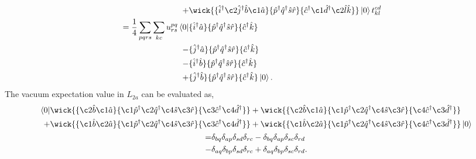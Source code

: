 \begin{align}
\begin{aligned}
{            } \\
            +
            &\wick{
            \{\hat{i}^\dagger \c2{\hat{j}}^\dagger \hat{b} \c1{\hat{a}} \}
            \{\hat{p}^\dagger \hat{q}^\dagger \hat{s} \hat{r} \}
            \{\hat{c}^\dagger \c1{\hat{d}^\dagger} \c2{\hat{l}} \hat{k} \}
            }
            \ket{0}t^{cd}_{kl} \\
        = \frac{1}{4} \sum_{pqrs} \sum_{kc} u^{pq}_{rs} \bra{0}
            &\{\hat{i}^\dagger \hat{a}\}
            \{\hat{p}^\dagger \hat{q}^\dagger \hat{s} \hat{r} \}
            \{\hat{c}^\dagger \hat{k} \} 
            \\ -
            &\{\hat{j}^\dagger \hat{a} \}
            \{\hat{p}^\dagger \hat{q}^\dagger \hat{s} \hat{r} \}
            \{\hat{c}^\dagger \hat{k} \} 
            \\ -
            &\{\hat{i}^\dagger \hat{b} \}
            \{\hat{p}^\dagger \hat{q}^\dagger \hat{s} \hat{r} \}
            \{\hat{c}^\dagger \hat{k} \} 
            \\ +
            &\{\hat{j}^\dagger \hat{b} \}
            \{\hat{p}^\dagger \hat{q}^\dagger \hat{s} \hat{r} \}
            \{\hat{c}^\dagger \hat{k} \} 
        \ket{0}.
    \end{aligned}
\end{align}
The vacuum expectation value in $L_{2a}$ can be evaluated as,
\begin{gather}
    \begin{aligned}
        \bra{0}
            &\wick{
            \{ \c2{\hat{b}} \c1{\hat{a}} \}
            \{ \c1{\hat{p}}^\dagger \c2{\hat{q}}^\dagger \c4{\hat{s}} \c3{\hat{r}} \}
            \{ \c3{\hat{c}}^\dagger \c4{\hat{d}}^\dagger \}
            } +
            \wick{
            \{ \c2{\hat{b}} \c1{\hat{a}} \}
            \{ \c1{\hat{p}}^\dagger \c2{\hat{q}}^\dagger \c4{\hat{s}} \c3{\hat{r}} \}
            \{ \c4{\hat{c}}^\dagger \c3{\hat{d}}^\dagger \}
            } \\ +
            &\wick{
            \{ \c1{\hat{b}} \c2{\hat{a}} \}
            \{ \c1{\hat{p}}^\dagger \c2{\hat{q}}^\dagger \c4{\hat{s}} \c3{\hat{r}} \}
            \{ \c3{\hat{c}}^\dagger \c4{\hat{d}}^\dagger \}
            } +
            \wick{
            \{ \c1{\hat{b}} \c2{\hat{a}} \}
            \{ \c1{\hat{p}}^\dagger \c2{\hat{q}}^\dagger \c4{\hat{s}} \c3{\hat{r}} \}
            \{ \c4{\hat{c}}^\dagger \c3{\hat{d}}^\dagger \}
            }
            \ket{0}
    \end{aligned} \\
    \begin{aligned}
         =&\delta_{bq}\delta_{ap}\delta_{sd}\delta_{rc}
          -\delta_{bq}\delta_{ap}\delta_{sc}\delta_{rd} \\
         -&\delta_{aq}\delta_{bp}\delta_{sd}\delta_{rc}
         + \delta_{aq}\delta_{bp}\delta_{sc}\delta_{rd}.
    \end{aligned}
\end{gather}
